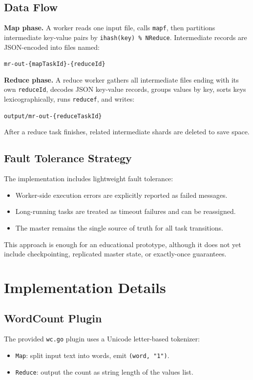\documentclass[12pt]{article}
\begin{document}
\subsection{Data Flow}
\textbf{Map phase.} A worker reads one input file, calls \texttt{mapf}, then partitions intermediate key-value pairs by \texttt{ihash(key) \% NReduce}. Intermediate records are JSON-encoded into files named:
\begin{center}
\texttt{mr-out-\{mapTaskId\}-\{reduceId\}}
\end{center}

\textbf{Reduce phase.} A reduce worker gathers all intermediate files ending with its own \texttt{reduceId}, decodes JSON key-value records, groups values by key, sorts keys lexicographically, runs \texttt{reducef}, and writes:
\begin{center}
\texttt{output/mr-out-\{reduceTaskId\}}
\end{center}

After a reduce task finishes, related intermediate shards are deleted to save space.

\subsection{Fault Tolerance Strategy}
The implementation includes lightweight fault tolerance:
\begin{itemize}[leftmargin=1.5em]
  \item Worker-side execution errors are explicitly reported as failed messages.
  \item Long-running tasks are treated as timeout failures and can be reassigned.
  \item The master remains the single source of truth for all task transitions.
\end{itemize}

This approach is enough for an educational prototype, although it does not yet include checkpointing, replicated master state, or exactly-once guarantees.

\section{Implementation Details}
\subsection{WordCount Plugin}
The provided \texttt{wc.go} plugin uses a Unicode letter-based tokenizer:
\begin{itemize}[leftmargin=1.5em]
  \item \texttt{Map}: split input text into words, emit \texttt{(word, "1")}.
  \item \texttt{Reduce}: output the count as string length of the values list.
\end{itemize}
\end{document}
